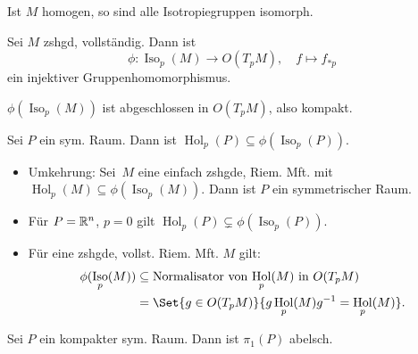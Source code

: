 \documentclass{cheat-sheet}
\DeclareMathOperator{\Iso}{Iso} %
\DeclareMathOperator{\Hol}{Hol} %
\begin{document}
\begin{kor}
  Ist $M$ homogen, so sind alle Isotropiegruppen isomorph.
\end{kor}

\begin{bem}
  Sei $M$ zshgd, vollständig. Dann ist
  \[
    \phi : \Iso_p(M) \to O(T_p M), \quad
    f \mapsto f_{*p}
  \]
  ein injektiver Gruppenhomomorphismus.
\end{bem}

\begin{satz}
  $\phi(\Iso_p(M))$ ist abgeschlossen in $O(T_p M)$, also kompakt.
\end{satz}

\iffalse
\begin{defn}
  Sei $M$ eine Riem. Mft, $p \in M$. Dann heißt
  \[
    \Hol_p(M) \coloneqq \Set{ P_c }{ c : \I \to M \text{ stückw. reg. Kurve, } c(0) \!=\! c(1) \!=\! p }
  \]
  \emph{Holonomiegruppe} von $p$ ($\Hol_p(M) \subseteq O(T_p M)$).
\end{defn}
\fi

\begin{satz}
  Sei $P$ ein sym. Raum. Dann ist $\Hol_p(P) \subseteq \phi(\Iso_p(P))$.
\end{satz}

\begin{bem}
  \begin{itemize}
    \item Umkehrung: Sei~$M$ eine einfach zshgde, Riem. Mft. mit $\Hol_p(M) \subseteq \phi(\Iso_p(M))$. Dann ist $P$ ein symmetrischer Raum. %
    \item Für $P = \mathbb{R}^n$, $p = 0$ gilt $\Hol_p(P) \subsetneq \phi(\Iso_p(P))$.
    \item Für eine zshgde, vollst. Riem. Mft. $M$ gilt:
    \begin{align*}
      \phi(\Iso_p(M)) & \subseteq \text{Normalisator von $\Hol_p(M)$ in $O(T_p M)$} \\
      & = \Set{ g \in O(T_p M) }{ g \Hol_p(M) g^{-1} = \Hol_p(M) }.
    \end{align*}
  \end{itemize}
\end{bem}

\begin{satz}
  Sei $P$ ein kompakter sym. Raum. Dann ist $\pi_1(P)$ abelsch.
\end{satz}

\end{document}
